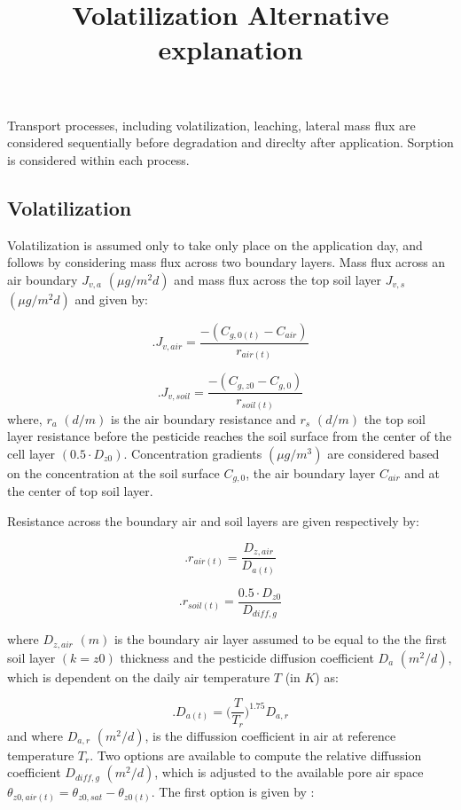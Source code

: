 \documentclass[]{article}
\title{Volatilization Alternative explanation}
\author{}
\date{}
\begin{document}
\maketitle

Transport processes, including volatilization, leaching, lateral mass
flux are considered sequentially before degradation and direclty after
application. Sorption is considered within each process.

\hypertarget{volatilization}{%
\subsection{Volatilization}\label{volatilization}}

Volatilization is assumed only to take only place on the application
day, and follows \cite{Leistra2001} by considering mass flux across two
boundary layers. Mass flux across an air boundary \(J_{v,a}\)
\((\mu g/ m^2d)\) and mass flux across the top soil layer \(J_{v,s}\)
\((\mu g/ m^2d)\) and given by:

\[.
J_{v,air} = \frac{-(C_{g,0(t)}-C_{air})}{r_{air(t)}}
\]

\[.
J_{v,soil} = \frac{-(C_{g,z0}-C_{g,0})}{r_{soil(t)}}
\] where, \(r_a\) \((d/m)\) is the air boundary resistance and \(r_s\)
\((d/m)\) the top soil layer resistance before the pesticide reaches the
soil surface from the center of the cell layer \((0.5 \cdot D_{z0})\).
Concentration gradients \((\mu g/m^3)\) are considered based on the
concentration at the soil surface \(C_{g,0}\), the air boundary layer
\(C_{air}\) and at the center of top soil layer.

Resistance across the boundary air and soil layers are given
respectively by:

\[.
r_{air(t)} = \frac{D_{z,air}}{D_{a(t)}} 
\]

\[.
r_{soil(t)} = \frac{0.5 \cdot D_{z0}}{D_{diff,g}} 
\]

where \(D_{z,air}\) \((m)\) is the boundary air layer assumed to be
equal to the the first soil layer \((k=z0)\) thickness and the pesticide
diffusion coefficient \(D_a\) \((m^2/d)\), which is dependent on the
daily air temperature \(T\) (in \(K\)) as:

\[.
D_{a(t)} = \Big( \frac{T}{T_r}\Big)^{1.75}D_{a,r}
\] and where \(D_{a,r}\) \((m^2/d)\), is the diffussion coefficient in
air at reference temperature \(T_r\). Two options are available to
compute the relative diffussion coefficient \(D_{diff,g}\) \((m^2/d)\),
which is adjusted to the available pore air space
\(\theta_{z0,air(t)} = \theta_{z0,sat}-\theta_{z0(t)}\). The first
option is given by \citep{Millington1960, Jin1996}:
\end{document}
